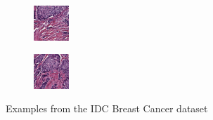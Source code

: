 \begin{figure}[h]
\begin{subfigure}[b]{.2\linewidth}
\end{subfigure}
\begin{subfigure}[b]{.2\linewidth}
\includegraphics[width=\linewidth]{Figs/8864_idx5_x1801_y2651_class1.png}
\end{subfigure}
\begin{subfigure}[b]{.2\linewidth}
\includegraphics[width=\linewidth]{Figs/8864_idx5_x1801_y2551_class1.png}
\end{subfigure}
\caption{Examples from the IDC Breast Cancer dataset}
\label{IDC}
\end{figure}

